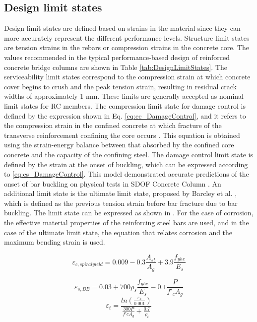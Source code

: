 \subsection{Design limit states}
Design limit states are defined based on strains in the material since they can more accurately represent the different performance levels. Structure limit states are tension strains in the rebars or compression strains in the concrete core. The values recommended in the typical performance-based design of reinforced concrete bridge columns are shown in Table  \ref{tab:DesignLimitStates}. The serviceability limit states correspond to the compression strain at which concrete cover begins to crush and the peak tension strain, resulting in residual crack widths of approximately 1 mm. These limits are generally accepted as nominal limit states for RC members. The compression limit state for damage control is defined by the expression shown in Eq. \ref{eq:ec_DamageControl}, and it refers to the compression strain in the confined concrete at which fracture of the transverse reinforcement confining the core occurs \cite{Priestley2007}. This equation is obtained using the strain-energy balance between that absorbed by the confined core concrete and the capacity of the confining steel. The damage control limit state is defined by the strain at the onset of buckling, which can be expressed according to \ref{eq:es_DamageControl}. This model demonstrated accurate predictions of the onset of bar buckling on physical tests in SDOF Concrete Column \cite{Goodnight2016}. An additional limit state is the ultimate limit state, proposed by Barcley et al. \cite{Barcley2019}, which is defined as the previous tension strain before bar fracture due to bar buckling. The limit state can be expressed as shown in . For the case of corrosion, the effective material properties of the reinforcing steel bars are used, and in the case of the ultimate limit state, the equation that relates corrosion and the maximum bending strain is used.

\begin{equation}
    \varepsilon_{c,spiral yield}=0.009-0.3\frac{A_{st}}{A_{g}} +3.9\frac{f_{yhe}}{E_{s}}
    \label{eq:ec_DamageControl}
\end{equation}

\begin{equation}
    \varepsilon_{s,BB}=0.03+700\rho_{s}  \frac{f_{yhe}}{E_{s}} -0.1\frac{P}{f'_{c}A_{g}}
    \label{eq:es_DamageControl}
\end{equation}
\begin{equation}
    \varepsilon_{t}=\frac{ln(\frac{\varepsilon_{b}}{0.001})}{\frac{300P}{f'c A_{g}}+\frac{0.7}{\rho_{t}}}
    \label{eq:es_ultimate}
\end{equation}

